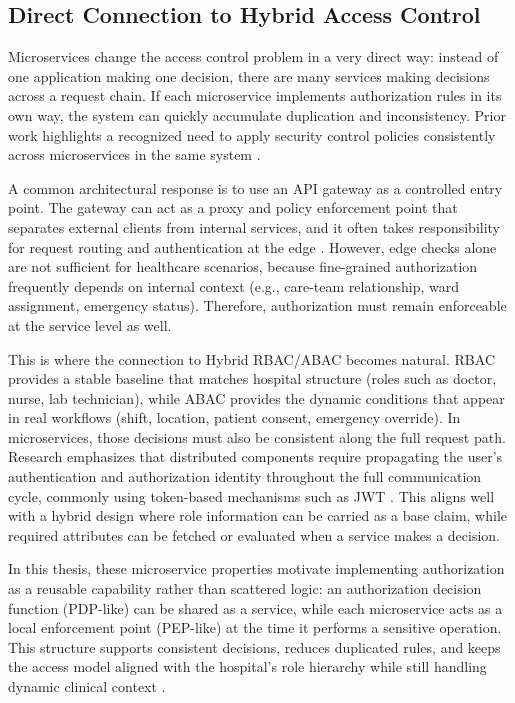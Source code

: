 \subsection{Direct Connection to Hybrid Access Control}
\label{sec:microservices-hybrid-connection}
Microservices change the access control problem in a very direct way: instead of one application making one decision, there are many services making decisions across a request chain. If each microservice implements authorization rules in its own way, the system can quickly accumulate duplication and inconsistency. Prior work highlights a recognized need to apply security control policies consistently across microservices in the same system \cite{AbdelfattahCerny2022}.
\vspace{0.5cm}


A common architectural response is to use an API gateway as a controlled entry point. The gateway can act as a proxy and policy enforcement point that separates external clients from internal services, and it often takes responsibility for request routing and authentication at the edge \cite{AbdelfattahCerny2022}. However, edge checks alone are not sufficient for healthcare scenarios, because fine-grained authorization frequently depends on internal context (e.g., care-team relationship, ward assignment, emergency status). Therefore, authorization must remain enforceable at the service level as well.
\vspace{0.5cm}


This is where the connection to Hybrid RBAC/ABAC becomes natural. RBAC provides a stable baseline that matches hospital structure (roles such as doctor, nurse, lab technician), while ABAC provides the dynamic conditions that appear in real workflows (shift, location, patient consent, emergency override). In microservices, those decisions must also be consistent along the full request path. Research emphasizes that distributed components require propagating the user’s authentication and authorization identity throughout the full communication cycle, commonly using token-based mechanisms such as JWT \cite{AbdelfattahCerny2022,Yarygina2018}. This aligns well with a hybrid design where role information can be carried as a base claim, while required attributes can be fetched or evaluated when a service makes a decision.
\vspace{0.5cm}


In this thesis, these microservice properties motivate implementing authorization as a reusable capability rather than scattered logic: an authorization decision function (PDP-like) can be shared as a service, while each microservice acts as a local enforcement point (PEP-like) at the time it performs a sensitive operation. This structure supports consistent decisions, reduces duplicated rules, and keeps the access model aligned with the hospital’s role hierarchy while still handling dynamic clinical context \cite{AbdelfattahCerny2022}.



